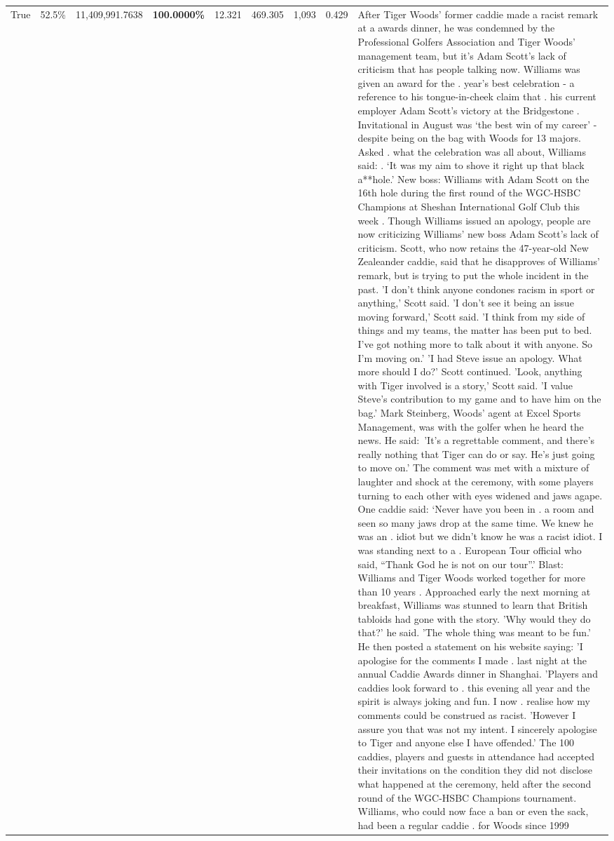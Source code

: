 \begin{table}[H]
\begin{tabular}{lllrlllll}
True & 52.5\% & 11,409,991.7638 & \bfseries \color{red} 100.0000\% & 12.321 & 469.305 & 1,093 & 0.429 & After Tiger Woods' former caddie made a racist remark at a awards dinner, he was condemned by the Professional Golfers Association and Tiger Woods' management team, but it's Adam Scott's lack of criticism that has people talking now. Williams was given an award for the . year’s best celebration - a reference to his tongue-in-cheek claim that . his current employer Adam Scott’s victory at the Bridgestone . Invitational in August was ‘the best win of my career’ - despite being on the bag with Woods for 13 majors. Asked . what the celebration was all about, Williams said: . ‘It was my aim to shove it right up that black a**hole.’ New boss: Williams with Adam Scott  on the 16th hole during the first round of the WGC-HSBC Champions at Sheshan International Golf Club this week . Though Williams issued an apology, people are now criticizing Williams' new boss Adam Scott's lack of criticism. Scott, who now retains the 47-year-old New Zealeander caddie, said that he disapproves of Williams' remark, but is trying to put the whole incident in the past. 'I don't think anyone condones racism in sport or anything,' Scott said. 'I don't see it being an issue moving forward,' Scott said. 'I think from my side of things and my teams, the matter has been put to bed. I've got nothing more to talk about it with anyone. So I'm moving on.' 'I had Steve issue an apology. What more should I do?' Scott continued. 'Look, anything with Tiger involved is a story,' Scott said. 'I value Steve's contribution to my game and to have him on the bag.' Mark Steinberg, Woods' agent at Excel Sports Management, was with the golfer when he heard the news. He said: 'It's a regrettable comment, and there's really nothing that Tiger can do or say. He's just going to move on.' The comment was met with a mixture of laughter and shock at the ceremony, with some players turning to each other with eyes widened and jaws agape. One caddie said: ‘Never have you been in . a room and seen so many jaws drop at the same time. We knew he was an . idiot but we didn’t know he was a racist idiot. I was standing next to a . European Tour official who said, “Thank God he is not on our tour”.’ Blast: Williams and Tiger Woods worked together for more than 10 years . Approached early the next morning at breakfast, Williams was stunned to learn that British tabloids had gone with the story. 'Why would they do that?' he said. 'The whole thing was meant to be fun.' He then posted a statement on his website saying: 'I apologise for the comments I made . last night at the annual Caddie Awards dinner in Shanghai. 'Players and caddies look forward to . this evening all year and the spirit is always joking and fun. I now . realise how my comments could be construed as racist. 'However I assure you that was not my intent. I sincerely apologise to Tiger and anyone else I have offended.' The 100 caddies, players and guests in attendance had accepted their invitations on the condition they did not disclose what happened at the ceremony, held after the second round of the WGC-HSBC Champions tournament. Williams, who could now face a ban or even the sack, had been a regular caddie . for Woods since 1999 
\end{tabular}
\end{table}
